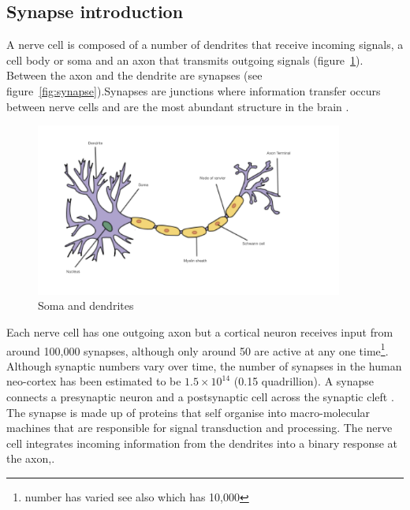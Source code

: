 \subsection{Synapse introduction}
A nerve cell is composed of a number of dendrites that receive incoming signals, a cell body or soma and an axon that transmits outgoing signals (figure~\ref{fig:soma and dendrites}). Between the axon and the dendrite are synapses (see figure~\ref{fig:synapse}).Synapses are junctions where information transfer occurs between nerve cells and are the most abundant structure in the brain \cite{grant2012synaptopathies}.



\begin{figure}
    \centering
    \includegraphics[width=0.9\textwidth]{images/nerve_cell001.jpeg}
    \caption{Soma and dendrites}
    \label{fig:soma and dendrites}
\end{figure}

Each nerve cell has one outgoing axon but a cortical neuron receives input from around 100,000 synapses, although only around 50 are active at any one time\cite{lisman2017glutamatergic}\footnote{number has varied see also \cite{laughlin2003communication} which has 10,000}. 
Although synaptic numbers vary over time, the number of synapses in the human neo-cortex has been estimated to be $1.5 \times 10^{14}$ (0.15 quadrillion)\cite{pakkenberg2003aging}. A synapse connects a presynaptic neuron and a postsynaptic cell across the synaptic cleft \cite{sudhof2012presynaptic}. The synapse is made up of proteins that self organise into macro-molecular machines that are responsible for signal transduction and processing\cite{frank2016nmda}.  The nerve cell integrates incoming information from the dendrites into a binary response at the axon\cite{lassek2015synaptic},\cite{pocklington2006proteomes}.

